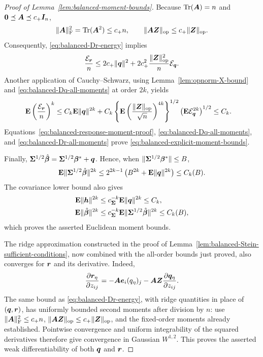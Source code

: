 \documentclass{article}
\theoremstyle{plain} %
\theoremstyle{definition} %
\theoremstyle{definition} %
\begin{document}
\begin{proof}[Proof of Lemma~\ref{lem:balanced-moment-bounds}]
Because $\operatorname{Tr}(\boldsymbol{A})=n$ and
$\mathbf{0}\preceq\boldsymbol{A}\preceq c_+\boldsymbol{I}_n$,
\begin{align*}
    \lVert\boldsymbol{A}\rVert_{\rm F}^2
    =\operatorname{Tr}(\boldsymbol{A}^2)\leq c_+n,
    \qquad
    \lVert\boldsymbol{A}\boldsymbol{Z}\rVert_{\rm op}\leq c_+\lVert\boldsymbol{Z}\rVert_{\rm op}.
\end{align*}
Consequently, \eqref{eq:balanced-Dr-energy} implies
\begin{align*}
    \frac{{\mathcal E}_{\boldsymbol{r}}}{n}
    \leq 2c_+\lVert\boldsymbol{q}\rVert^2
       +2c_+^2\frac{\lVert\boldsymbol{Z}\rVert_{\rm op}^2}{n}{\mathcal E}_{\boldsymbol{q}}.
\end{align*}
Another application of Cauchy--Schwarz, using
Lemma~\ref{lem:opnorm-X-bound} and
\eqref{eq:balanced-Dq-all-moments} at order $2k$, yields
\begin{align}
    {\mathbf{E}}\left(\frac{{\mathcal E}_{\boldsymbol{r}}}{n}\right)^k
    &\leq C_k{\mathbf{E}}\lVert\boldsymbol{q}\rVert^{2k}
       +C_k
        \left\{{\mathbf{E}}\left(
           \frac{\lVert\boldsymbol{Z}\rVert_{\rm op}}{\sqrt n}
        \right)^{4k}\right\}^{1/2}
        \left({\mathbf{E}}{\mathcal E}_{\boldsymbol{q}}^{2k}\right)^{1/2}
     \leq C_k.
    \label{eq:balanced-Dr-all-moments}
\end{align}
Equations~\eqref{eq:balanced-response-moment-proof},
\eqref{eq:balanced-Dq-all-moments}, and
\eqref{eq:balanced-Dr-all-moments} prove
\eqref{eq:balanced-explicit-moment-bounds}.

Finally,
$\boldsymbol{\Sigma}^{1/2}\hat{\boldsymbol{\beta}}{}=\boldsymbol{\Sigma}^{1/2}\boldsymbol{\beta}^*+\boldsymbol{q}$.  Hence, when
$\lVert\boldsymbol{\Sigma}^{1/2}\boldsymbol{\beta}^*\rVert\leq B$,
\begin{align*}
    {\mathbf{E}}\lVert\boldsymbol{\Sigma}^{1/2}\hat{\boldsymbol{\beta}}{}\rVert^{2k}
    \leq 2^{2k-1}\left(B^{2k}+{\mathbf{E}}\lVert\boldsymbol{q}\rVert^{2k}\right)
    \leq C_k(B).
\end{align*}
The covariance lower bound also gives
\begin{align*}
    {\mathbf{E}}\lVert\boldsymbol{h}\rVert^{2k}
    &\leq c_{\boldsymbol{\Sigma}}^{-k}{\mathbf{E}}\lVert\boldsymbol{q}\rVert^{2k}\leq C_k,\\
    {\mathbf{E}}\lVert\hat{\boldsymbol{\beta}}{}\rVert^{2k}
    &\leq c_{\boldsymbol{\Sigma}}^{-k}
       {\mathbf{E}}\lVert\boldsymbol{\Sigma}^{1/2}\hat{\boldsymbol{\beta}}{}\rVert^{2k}
      \leq C_k(B),
\end{align*}
which proves the asserted Euclidean moment bounds.

The ridge approximation constructed in the proof of
Lemma~\ref{lem:balanced-Stein-sufficient-conditions}, now combined with the
all-order bounds just proved, also converges for $\boldsymbol{r}$ and its derivative.
Indeed,
\begin{align*}
    \pdv{\boldsymbol{r}_\eta}{z_{ij}}
    =-\boldsymbol{A}\boldsymbol{e}_i(q_\eta)_j
      -\boldsymbol{A}\boldsymbol{Z}\pdv{\boldsymbol{q}_\eta}{z_{ij}}.
\end{align*}
The same bound as \eqref{eq:balanced-Dr-energy}, with ridge quantities
in place of $(\boldsymbol{q},\boldsymbol{r})$, has uniformly bounded second moments after
division by $n$: use $\lVert\boldsymbol{A}\rVert_{\rm F}^2\leq c_+n$,
$\lVert\boldsymbol{A}\boldsymbol{Z}\rVert_{\rm op}\leq c_+\lVert\boldsymbol{Z}\rVert_{\rm op}$, and the fixed-order
moments already established.  Pointwise convergence and uniform
integrability of the squared derivatives therefore give convergence in
Gaussian $W^{1,2}$.  This proves the asserted weak differentiability
of both $\boldsymbol{q}$ and $\boldsymbol{r}$.
\end{proof}
\end{document}
